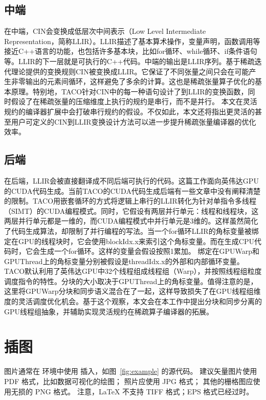 \subsection{中端}
在中端，CIN会变换成低层次中间表示（Low Level Intermediate Representation，简称LLIR）。LLIR描述了基本算术操作，变量声明，函数调用等接近C++语言的功能，也包括许多基本块，比如for循环、while循环、if条件语句等。LLIR的下一层就是可执行的C++代码。中端的输出是LLIR序列。基于稀疏迭代理论\cite{kjolstad:2020:phd-thesis}提供的变换规则CIN被变换成LLIR。它保证了不同张量之间只会在可能产生非零输出的元素间循环，这样避免了多余的计算。这也是稀疏张量算子优化的基本原理。特别地，TACO针对CIN中的每一种语句设计了到LLIR的变换函数，同时假设了在稀疏张量的压缩维度上执行的规约是串行，而不是并行。
本文在灵活规约的编译器扩展中会打破串行规约的假设。不仅如此，本文还将指出更灵活的甚至用户可定义的CIN到LLIR变换设计方法可以进一步提升稀疏张量编译器的优化效率。
\subsection{后端}
在后端，LLIR会被直接翻译成不同后端可执行的代码。这篇工作面向英伟达GPU的CUDA代码生成。当前TACO的CUDA代码生成后端有一些文章中没有阐释清楚的限制。TACO用嵌套循环的方式\cite{senanayake:2020:scheduling}将逻辑上串行的LLIR转化为针对单指令多线程（SIMT）的CUDA编程模式。同时，它假设有两层并行单元：线程和线程块，这两层并行单元都是一维的，而CUDA编程模式中并行单元是3维的。这样虽然简化了代码生成算法，却限制了并行编程的写法。当一个for循环LLIR的角标变量被绑定在GPU的线程块时，它会使用blockIdx.x来索引这个角标变量。而在生成CPU代码时，它会生成一个for循环。这样的变量会假设按照1累加。
绑定在GPUWarp和GPUThread上的角标变量分别被假设是threadIdx.x的外部和内部循环变量。TACO默认利用了英伟达GPU中32个线程组成线程组（Warp），并按照线程组粒度调度指令的特性。分块的大小取决于GPUThread上的角标变量。值得注意的是，这里将GPUWarp分块和同步语义混合在了一起，这样导致损失了在GPU线程组维度的灵活调度优化机会。基于这个观察，本文会在本工作中提出分块和同步分离的GPU线程组抽象，并辅助实现灵活规约在稀疏算子编译器的拓展。

\section{插图}

图片通常在  环境中使用  插入，如图~\ref{fig:example} 的源代码。
建议矢量图片使用 PDF 格式，比如数据可视化的绘图；
照片应使用 JPG 格式；
其他的栅格图应使用无损的 PNG 格式。
注意，LaTeX 不支持 TIFF 格式；EPS 格式已经过时。

